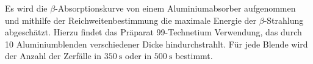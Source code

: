 Es wird die \texorpdfstring{$\beta$}{Beta}-Absorptionskurve von einem Aluminiumabsorber aufgenommen und 
mithilfe der Reichweitenbestimmung die maximale Energie der \texorpdfstring{$\beta$}{Beta}-Strahlung abgeschätzt.
Hierzu findet das Präparat 99-Technetium Verwendung, das durch 10 Aluminiumblenden verschiedener Dicke hindurchstrahlt.
Für jede Blende wird der Anzahl der Zerfälle in $\SI{350}{\second}$ oder in $\SI{500}{\second}$ bestimmt.
